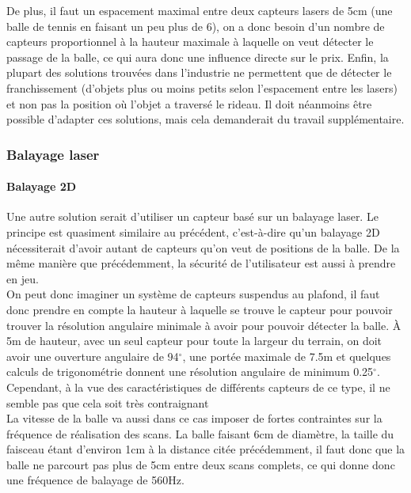 De plus, il faut un espacement maximal entre deux capteurs lasers de 5cm (une balle de tennis en faisant un peu plus de 6), on a donc besoin d'un nombre de capteurs proportionnel à la hauteur maximale à laquelle on veut détecter le passage de la balle, ce qui aura donc une influence directe sur le prix. Enfin, la plupart des solutions trouvées dans l'industrie ne permettent que de détecter le franchissement (d'objets plus ou moins petits selon l'espacement entre les lasers) et non pas la position où l'objet a traversé le rideau. Il doit néanmoins être possible d'adapter ces solutions, mais cela demanderait du travail supplémentaire. 


\subsubsection{Balayage laser}

\paragraph{Balayage 2D\\}

Une autre solution serait d'utiliser un capteur basé sur un balayage laser. Le principe est quasiment similaire au précédent, c'est-à-dire qu'un balayage 2D nécessiterait d'avoir autant de capteurs qu'on veut de positions de la balle. De la même manière que précédemment, la sécurité de l'utilisateur est aussi à prendre en jeu. \\

On peut donc imaginer un système de capteurs suspendus au plafond, il faut donc prendre en compte la hauteur à laquelle se trouve le capteur pour pouvoir trouver la résolution angulaire minimale à avoir pour pouvoir détecter la balle. À 5m de hauteur, avec un seul capteur pour toute la largeur du terrain, on doit avoir une ouverture angulaire de 94$^{\circ}$, une portée maximale de 7.5m et quelques calculs de trigonométrie donnent une résolution angulaire de minimum 0.25$^{\circ}$. Cependant, à la vue des caractéristiques de différents capteurs de ce type, il ne semble pas que cela soit très contraignant \\ 

La vitesse de la balle va aussi dans ce cas imposer de fortes contraintes sur la fréquence de réalisation des scans. La balle faisant 6cm de diamètre, la taille du faisceau étant d'environ 1cm à la distance citée précédemment, il faut donc que la balle ne parcourt pas plus de 5cm entre deux scans complets, ce qui donne donc une fréquence de balayage de 560Hz. \\

